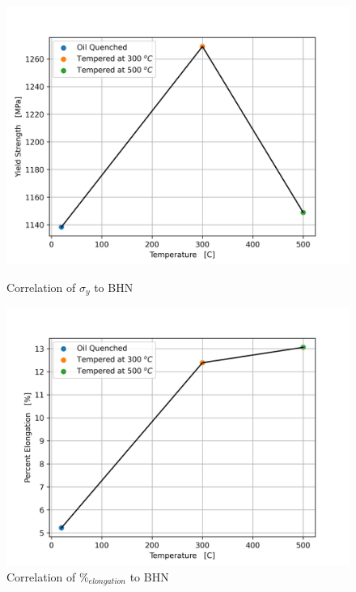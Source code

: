 \documentclass{article}
\begin{document}
\begin{figure}[!h!]
\begin{minipage}[b]{.5\linewidth}
    \includegraphics[width=\linewidth]{plots/q6_offset.png}
    \caption{Correlation of $\sigma_y$ to BHN}
    \label{fig:q6-yield}
    \vspace{4ex}
\end{minipage}
\begin{minipage}[b]{.5\linewidth}
    \includegraphics[width=\linewidth]{plots/q6_per_elong.png}
    \caption{Correlation of $\%_{elongation}$ to BHN}
    \label{fig:q6-perelong}
    \vspace{4ex}
\end{minipage}
\begin{minipage}[b]{.5\linewidth}

\end{minipage}
\end{figure}
\end{document}
